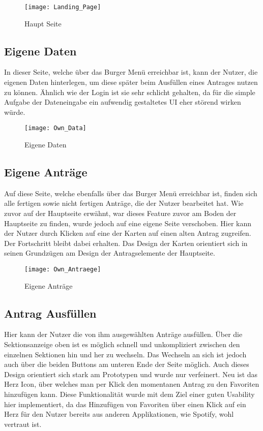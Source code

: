 \begin{figure}[h]
\centering
\texttt{[image: Landing\_Page]}
\caption{Haupt Seite}\label{Hautp Seite}
\end{figure}

\pagebreak

\subsection{Eigene Daten}\label{Eigene Daten}
In dieser Seite, welche über das Burger Menü erreichbar ist, kann der Nutzer, die eigenen
Daten hinterlegen, um diese später beim Ausfüllen eines Antrages nutzen zu können. Ähnlich
wie der Login ist sie sehr schlicht gehalten, da für die simple Aufgabe der Dateneingabe ein
aufwendig gestaltetes \ac{UI} eher störend wirken würde.

\begin{figure}[h]
\centering
\texttt{[image: Own\_Data]}
\caption{Eigene Daten}\label{Eigene Daten}
\end{figure}

\pagebreak

\subsection{Eigene Anträge}\label{Eigene Anträge}

Auf diese Seite, welche ebenfalls über das Burger Menü erreichbar ist, finden sich alle
fertigen sowie nicht fertigen Anträge, die der Nutzer bearbeitet hat. Wie zuvor auf der Hauptseite erwähnt, war dieses Feature zuvor am Boden der Hauptseite zu finden, wurde
jedoch auf eine eigene Seite verschoben. Hier kann der Nutzer durch Klicken auf eine der
Karten auf einen alten Antrag zugreifen. Der Fortschritt bleibt dabei erhalten. Das Design
der Karten orientiert sich in seinen Grundzügen am Design der Antragselemente der
Hauptseite.

\begin{figure}[h]
\centering
\texttt{[image: Own\_Antraege]}
\caption{Eigene Anträge}\label{Eigene Daten}
\end{figure}

\pagebreak

\subsection{Antrag Ausfüllen}\label{Antrag Ausfüllen}

Hier kann der Nutzer die von ihm ausgewählten Anträge ausfüllen. Über die Sektionsanzeige
oben ist es möglich schnell und unkompliziert zwischen den einzelnen Sektionen hin und her
zu wechseln. Das Wechseln an sich ist jedoch auch über die beiden Buttons am unteren Ende
der Seite möglich. Auch dieses Design orientiert sich stark am Prototypen und wurde nur
verfeinert. Neu ist das Herz Icon, über welches man per Klick den momentanen Antrag zu den
Favoriten hinzufügen kann. Diese Funktionalität wurde mit dem Ziel einer guten Usability
hier implementiert, da das Hinzufügen von Favoriten über einen Klick auf ein Herz für
den Nutzer bereits aus anderen Applikationen, wie Spotify, wohl vertraut ist.

